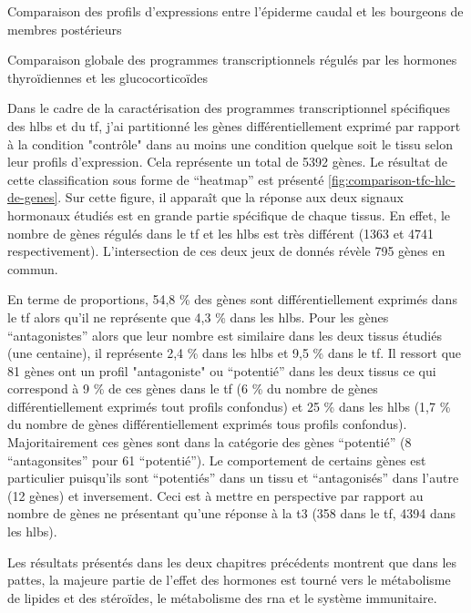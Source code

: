 \documentclass[../main.tex]{subfiles}
\begin{document}
\begin{chapter}{Comparaison des profils d'expressions entre l'épiderme caudal et les bourgeons de membres postérieurs}

\begin{section}{Comparaison globale des programmes transcriptionnels régulés par les hormones thyroïdiennes et les glucocorticoïdes}

Dans le cadre de la caractérisation des programmes transcriptionnel spécifiques des \glspl{hlb} et du \gls{tf}, j'ai partitionné les gènes différentiellement exprimé par rapport à la condition "contrôle" dans au moins une condition quelque soit le tissu selon leur profils d'expression.
Cela représente un total de 5392 gènes.
Le résultat de cette classification sous forme de ``heatmap'' est présenté \autoref{fig:comparison-tfc-hlc-de-genes}.
Sur cette figure, il apparaît que la réponse aux deux signaux hormonaux étudiés est en grande partie spécifique de chaque tissus.
En effet, le nombre de gènes régulés dans le \gls{tf} et les \glspl{hlb} est très différent (1363 et 4741 respectivement).
L'intersection de ces deux jeux de donnés révèle 795 gènes en commun.
\par
En terme de proportions, 54,8 \% des gènes sont différentiellement exprimés dans le \gls{tf} alors qu'il ne représente que 4,3 \% dans les \glspl{hlb}.
Pour les gènes ``antagonistes'' alors que leur nombre est similaire dans les deux tissus étudiés (une centaine), il représente 2,4 \% dans les \glspl{hlb} et 9,5 \% dans le \gls{tf}.
Il ressort que 81 gènes ont un profil "antagoniste" ou ``potentié'' dans les deux tissus ce qui correspond à 9 \% de ces gènes dans le \gls{tf} (6 \% du nombre de gènes différentiellement exprimés tout profils confondus) et 25 \% dans les \glspl{hlb} (1,7 \% du nombre de gènes différentiellement exprimés tous profils confondus).
Majoritairement ces gènes sont dans la catégorie des gènes ``potentié'' (8 ``antagonsites'' pour 61 ``potentié'').
Le comportement de certains gènes est particulier puisqu'ils sont ``potentiés'' dans un tissu et ``antagonisés'' dans l'autre (12 gènes) et inversement.
Ceci est à mettre en perspective par rapport au nombre de gènes ne présentant qu'une réponse à la \gls{t3} (358 dans le \gls{tf}, 4394 dans les \glspl{hlb}).
\par
Les résultats présentés dans les deux chapitres précédents montrent que dans les pattes, la majeure partie de l'effet des hormones est tourné vers le métabolisme de lipides et des stéroïdes, le métabolisme des \gls{rna} et le système immunitaire.

\end{section}
\end{chapter}
\end{document}
